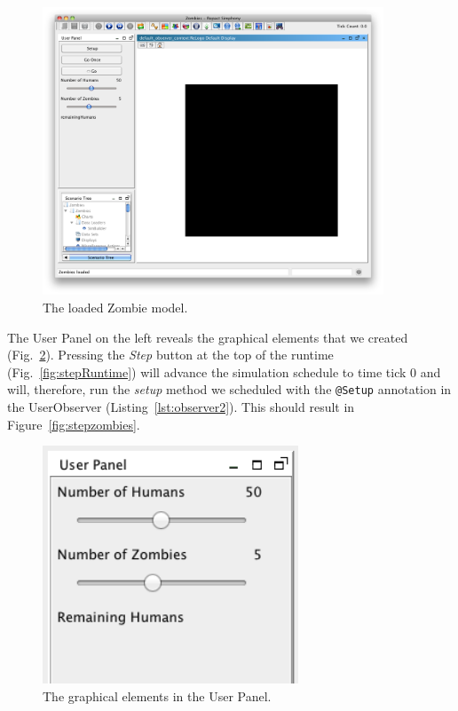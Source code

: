 \documentclass[11pt]{amsart}
\begin{document}
\begin{figure}
\begin{center}
\vspace{.2in}
\centerline {
\includegraphics[width=4in]{GettingStartedImages/LoadedZombies.png}
}
\caption{The loaded Zombie model.}
\label{fig:loadedzombies}
\end{center}
\end{figure}
The User Panel on the left reveals the graphical elements that we created (Fig.~\ref{fig:graphelem}). Pressing the \emph{Step} button at the top of the runtime (Fig.~\ref{fig:stepRuntime}) will advance the simulation schedule to time tick 0 and will, therefore, run the \emph{setup} method we scheduled with the \texttt{@Setup} annotation in the UserObserver (Listing~\ref{lst:observer2}). This should result in Figure~\ref{fig:stepzombies}.

\begin{figure}
\begin{center}
\vspace{.2in}
\centerline {
\includegraphics[width=3in]{GettingStartedImages/GraphicalElements.png}
}
\caption{The graphical elements in the User Panel.}
\label{fig:graphelem}
\end{center}
\end{figure}
\end{document}
